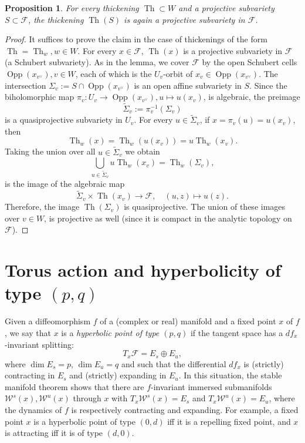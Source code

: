 \documentclass[12pt]{amsbook}%
\newtheorem{prop}[thm]{Proposition}
\theoremstyle{definition}
\theoremstyle{remark}
\numberwithin{section}{chapter}
\numberwithin{subsection}{section}
\numberwithin{figure}{chapter}
\DeclareMathOperator{\Th}{Th}
\DeclareMathOperator{\Opp}{Opp}
\def\cF{{\mathscr{F}}}
\def\cW{{\mathscr{W}}}
\def\mini{\scriptsize}
\begin{document}
{{\begin{prop}\label{prop:projective}
For every thickening $\Th\subset W$ and a projective subvariety $S\subset \cF$, the thickening $\Th(S)$ is again a projective subvariety in $\cF$. 
\end{prop}
\begin{proof} It suffices to prove the claim in the case of thickenings of the form $\Th=\Th_w, w\in W$. 
For every $x\in \cF$, $\Th(x)$ is a projective subvariety in $\cF$ (a Schubert subvariety). As in the lemma, 
we cover $\cF$ by the open Schubert cells $\Opp(x_{v^\vee}), v\in W$, each of which is the $U_v$-orbit of $x_v\in  \Opp(x_{v^\vee})$. The intersection $\Sigma_v:=S\cap \Opp(x_{v^\vee})$ is an open 
affine subvariety in $S$. 
Since the biholomorphic map $\pi_v: U_v\to \Opp(x_{v^\vee}), u\mapsto u(x_v)$, is 
algebraic, the preimage 
$$
\tilde\Sigma_v:= \pi_v^{-1}(\Sigma_v)
$$
is a quasiprojective subvariety in $U_v$. For every $u\in \tilde\Sigma_v$, if $x=\pi_v(u)=u(x_v)$, then 
$$
\Th_w(x)= \Th_w(u(x_v))= u \Th_w(x_v). 
$$
Taking the union over all $u\in \tilde\Sigma_v$ we obtain
$$
\bigcup_{u\in  \tilde\Sigma_v} u \Th_w(x_v)= \Th_w(\Sigma_v),
$$
is the image of the algebraic map 
$$
\tilde\Sigma_v\times \Th(x_v)\to \cF, \quad (u, z)\mapsto u(z). 
$$
Therefore, the image $\Th(\Sigma_v)$ is quasiprojective. The union of these images over $v\in W$, is 
projective as well (since it is compact in the analytic topology on $\cF$).    
\end{proof}







\section{Torus action and hyperbolicity of type $(p,q)$}

\label{section_torus_action}

Given a diffeomorphism $f$ of a (complex or real) manifold and a fixed point $x$ of $f$, we say that $x$ is a \textit{hyperbolic point of type $(p,q)$} if the tangent space has a $df_x$-invariant splitting: 
$$T_x \cF  = E_s \oplus E_u,$$ 
where $\dim E_s = p $, $\dim E_u=q$ and such that the differential $df_x$ is (strictly) contracting in $E_s$ and (strictly) expanding in $E_u$. 
In this situation, the stable manifold theorem shows that there are $f$-invariant immersed submanifolds $\cW^s(x), \cW^u(x)$ through $x$ 
with $T_x \cW^s(x)= E_s$ and $T_x \cW^u(x)= E_u$, where the dynamics of $f$ is respectively contracting and expanding.
For example, a fixed point $x$ is a hyperbolic point of type $(0, d)$ iff it is a repelling fixed point, and $x$ is attracting iff 
it is of type $(d, 0)$.

}}
\end{document}
